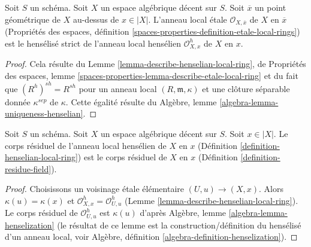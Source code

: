 \begin{lemma}
\label{lemma-henselian-local-ring-strict}
Soit $S$ un schéma. Soit $X$ un espace algébrique décent sur $S$.
Soit $\overline{x}$ un point géométrique de $X$ au-dessus de $x \in |X|$.
L'anneau local étale $\mathcal{O}_{X, \overline{x}}$ de $X$ en $\overline{x}$
(Propriétés des espaces, définition
\ref{spaces-properties-definition-etale-local-rings})
est le hensélisé strict
de l'anneau local hensélien $\mathcal{O}_{X, x}^h$ de $X$ en $x$.
\end{lemma}

\begin{proof}
Cela résulte du Lemme \ref{lemma-describe-henselian-local-ring},
de Propriétés des espaces, lemme
\ref{spaces-properties-lemma-describe-etale-local-ring}
et du fait que $(R^h)^{sh} = R^{sh}$
pour un anneau local $(R, \mathfrak m, \kappa)$ et une
clôture séparable donnée $\kappa^{sep}$ de $\kappa$.
Cette égalité résulte du
Algèbre, lemme \ref{algebra-lemma-uniqueness-henselian}.
\end{proof}

\begin{lemma}
\label{lemma-residue-field-henselian-local-ring}
Soit $S$ un schéma. Soit $X$ un espace algébrique décent sur $S$.
Soit $x \in |X|$. Le corps résiduel de
l'anneau local hensélien de $X$ en $x$
(Définition \ref{definition-henselian-local-ring})
est le corps résiduel de $X$ en $x$
(Définition \ref{definition-residue-field}).
\end{lemma}

\begin{proof}
Choisissons un voisinage étale élémentaire $(U, u) \to (X, x)$.
Alors $\kappa(u) = \kappa(x)$ et
$\mathcal{O}_{X, x}^h = \mathcal{O}_{U, u}^h$
(Lemme \ref{lemma-describe-henselian-local-ring}).
Le corps résiduel de $\mathcal{O}_{U, u}^h$
est $\kappa(u)$ d'après Algèbre, lemme \ref{algebra-lemma-henselization}
(le résultat de ce lemme est la construction/définition
du hensélisé d'un anneau local, voir
Algèbre, définition \ref{algebra-definition-henselization}).
\end{proof}

